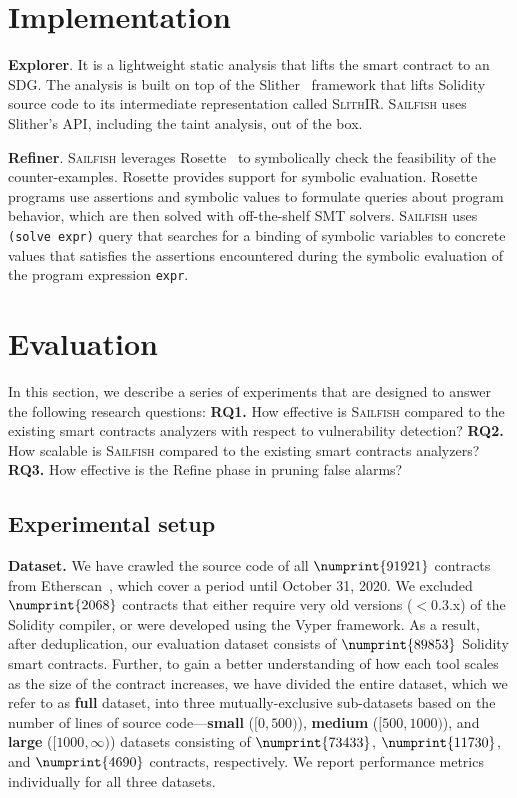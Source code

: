 \documentclass[conference, romanappendices]{tex/IEEEtran}
\theoremstyle{bfnote}
\newcommand{\toolname}{\textsc{Sailfish}\xspace}
\newcommand{\rosette}{{\sc Rosette}\xspace}
\newcommand{\refine}{{\sc Refine}\xspace}
\newcommand{\slither}{{\sc Slither}\xspace}
\newcommand{\solidity}{{\sc Solidity}\xspace}
\newcommand{\vyper}{{\sc Vyper}\xspace}
\newcommand{\smart}{smart contract}
\let\num\numprint
\newcommand{\contractsCrawled}{91921}
\newcommand{\contractsExcluded}{2068}
\newcommand{\dataset}{89853}
\newcommand{\smallDataset}{73433}
\newcommand{\mediumDataset}{11730}
\newcommand{\largeDataset}{4690}
\begin{document}
 	\section{Implementation}
\label{implementation}

\noindent
\textbf{Explorer}. It is a lightweight static analysis that lifts the \smart{} to an SDG. 
The analysis is built on top of the \slither~\cite{slither} framework that lifts \solidity{} source code to its intermediate representation called \textsc{SlithIR}.
\toolname uses \slither's API, including the taint analysis, out of the box.

	
	
	
	

\noindent
\textbf{Refiner}.
\toolname leverages \rosette~\cite{rosette} to symbolically check the feasibility of the counter-examples.
\rosette provides support for symbolic evaluation.
\rosette programs use assertions and symbolic values to formulate queries about program behavior, which are then solved with off-the-shelf SMT solvers.
\toolname uses \texttt{(solve expr)} query that searches for a binding of symbolic variables to concrete values that satisfies the assertions encountered during the symbolic evaluation of the program expression \texttt{expr}.
 	\section{Evaluation}
\label{evaluation}
In this section, we describe a series of experiments that are designed to answer the following research questions:
\textbf{RQ1.} How effective is \toolname compared to the existing smart contracts analyzers with respect to vulnerability detection?
\textbf{RQ2.} How scalable is \toolname compared to the existing smart contracts analyzers?
\textbf{RQ3.} How effective is the \refine phase in pruning false alarms?

\subsection{Experimental setup}
\vspace{-1mm}
\noindent
\textbf{Dataset.}
We have crawled the source code of all $\num{\contractsCrawled}$ contracts from Etherscan~\cite{etherscan}, which cover a period until October 31, 2020.
We excluded $\num{\contractsExcluded}$ contracts that either require very old versions ($<$0.3.x) of the \solidity{} compiler, or were developed using the \vyper{} framework. 
As a result, after deduplication, our evaluation dataset consists of $\num{\dataset}$ \solidity{} \smart s.
Further, to gain a better understanding of how each tool scales as the size of the contract increases, we have divided the entire dataset, which we refer to as \textbf{full} dataset, into three mutually-exclusive sub-datasets based on the number of lines of source code---\textbf{small} ($[0, 500)$), \textbf{medium} ($[500, 1000)$), and \textbf{large} ($[1000, \infty)$) datasets consisting of $\num{\smallDataset}$, $\num{\mediumDataset}$, and $\num{\largeDataset}$ contracts, respectively.
We report performance metrics individually for all three datasets.
\end{document}

